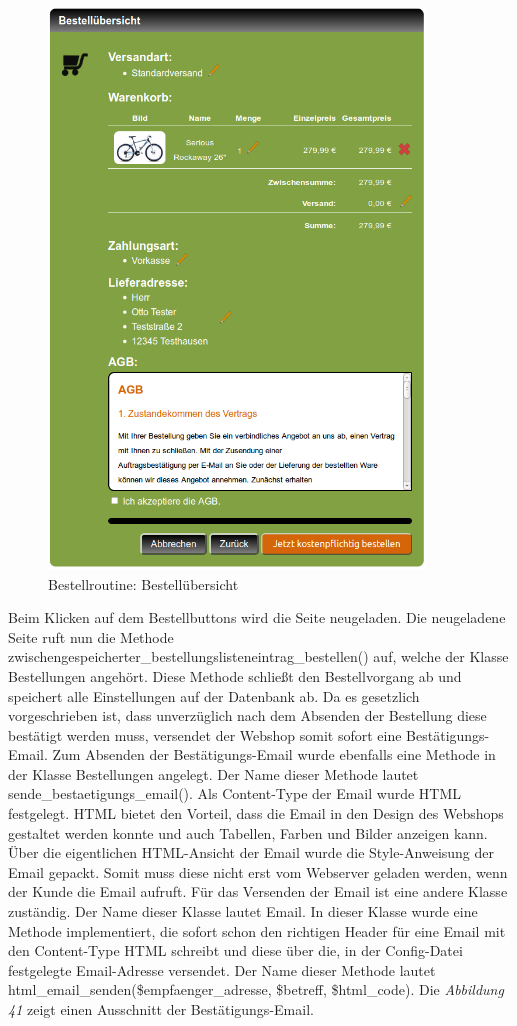 \begin{figure}[H]
	\begin{center}
			\includegraphics[width=100mm]{Bilder/bestelluebersicht.png}
	\end{center}
	\caption{Bestellroutine: Bestellübersicht}
\end{figure}

Beim Klicken auf dem  Bestellbuttons wird die Seite neugeladen. Die neugeladene Seite ruft nun die Methode \glqq zwischengespeicherter\_bestellungslisteneintrag\_bestellen()\grqq{} auf, welche der Klasse \glqq Bestellungen\grqq{} angehört. Diese Methode schließt den Bestellvorgang ab und speichert alle Einstellungen auf der Datenbank ab. Da es gesetzlich vorgeschrieben ist, dass unverzüglich nach dem Absenden der Bestellung diese bestätigt werden muss, versendet der Webshop somit sofort eine Bestätigungs-Email. Zum Absenden der Bestätigungs-Email wurde ebenfalls eine Methode in der Klasse \glqq Bestellungen\grqq{} angelegt. Der Name dieser Methode lautet \glqq sende\_bestaetigungs\_email()\grqq{}. Als Content-Type der Email wurde HTML festgelegt. HTML bietet den Vorteil, dass die Email in den Design des Webshops gestaltet werden konnte und auch Tabellen, Farben und Bilder anzeigen kann. Über die eigentlichen HTML-Ansicht der Email wurde die Style-Anweisung der Email gepackt. Somit muss diese nicht erst vom Webserver geladen werden, wenn der Kunde die Email aufruft. Für das Versenden der Email ist eine andere Klasse zuständig. Der Name dieser Klasse lautet \glqq Email\grqq{}. In dieser Klasse wurde eine Methode implementiert, die sofort schon den richtigen Header für eine Email mit den Content-Type \glqq HTML\grqq{} schreibt und diese über die, in der \glqq Config-Datei\grqq{} festgelegte Email-Adresse versendet. Der Name dieser Methode lautet \glqq html\_email\_senden(\$empfaenger\_adresse, \$betreff, \$html\_code)\grqq{}. Die \textit{Abbildung 41} zeigt einen Ausschnitt der Bestätigungs-Email.

